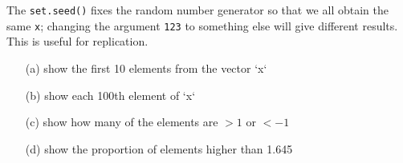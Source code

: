 \documentclass[]{article}
\begin{document}
The \texttt{set.seed()} fixes the random number generator so that we all
obtain the same \texttt{x}; changing the argument \texttt{123} to
something else will give different results. This is useful for
replication.

\begin{itemize}
\item[(a)] show the first 10 elements from the vector `x`
\item[(b)] show each 100th element of `x`
\item[(c)] show how many of the elements are $> 1$ or $< -1$ 
\item[(d)] show the proportion of elements higher than 1.645 
\end{itemize}
\end{document}
